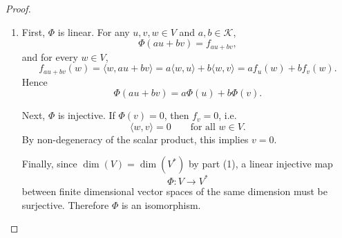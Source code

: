 \documentclass{ctexart}
\begin{document}
\begin{proof}
\begin{enumerate}
        \item First, $\Phi$ is linear. For any $u,v,w\in V$ and $a,b\in \mathcal{K}$,
        \[
        \Phi(au+bv)=f_{au+bv},
        \]
        and for every $w\in V$,
        \[
        f_{au+bv}(w)
        =
        \langle w,au+bv\rangle
        =
        a\langle w,u\rangle+b\langle w,v\rangle
        =
        af_u(w)+bf_v(w).
        \]
        Hence
        \[
        \Phi(au+bv)=a\Phi(u)+b\Phi(v).
        \]

        Next, $\Phi$ is injective. If $\Phi(v)=0$, then $f_v=0$, i.e.
        \[
        \langle w,v\rangle=0
        \qquad
        \text{for all } w\in V.
        \]
        By non-degeneracy of the scalar product, this implies $v=0$.

        Finally, since $\dim(V)=\dim(V^*)$ by part (1), a linear injective map
        \[
        \Phi:V\to V^*
        \]
        between finite dimensional vector spaces of the same dimension must be surjective. Therefore $\Phi$ is an isomorphism.
    \end{enumerate}
    \end{proof}
\end{document}
